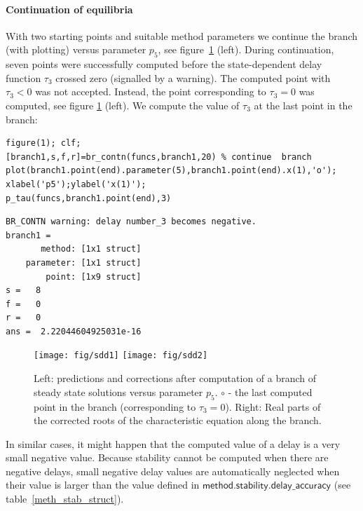 \documentclass[10pt]{scrartcl}
\newcommand{\parm}[1]{\mathsf{#1}}
\begin{document}
\paragraph{Continuation of equilibria}
With two starting points and suitable method parameters
we continue the branch (with plotting) versus parameter $p_5$,
see figure~\ref{br_stst} (left).
During continuation, seven points were successfully computed
before the state-dependent delay function $\tau_3$ crossed zero 
(signalled by a warning). 
The computed point with $\tau_3<0$ was not accepted. Instead, the point 
corresponding to $\tau_3=0$ was computed, see figure
\ref{br_stst} (left). We compute the value of $\tau_3$ at 
the last point in the branch:
\begin{lstlisting}
figure(1); clf;
[branch1,s,f,r]=br_contn(funcs,branch1,20) % continue  branch
plot(branch1.point(end).parameter(5),branch1.point(end).x(1),'o');
xlabel('p5');ylabel('x(1)');
p_tau(funcs,branch1.point(end),3)  
\end{lstlisting}
{\small
\begin{verbatim}
BR_CONTN warning: delay number_3 becomes negative.
branch1 = 
       method: [1x1 struct]
    parameter: [1x1 struct]
        point: [1x9 struct]
s =   8
f =   0
r =   0
ans =  2.22044604925031e-16
\end{verbatim}}

\begin{figure}[h]
\begin{center}
\texttt{[image: fig/sdd1]}
\texttt{[image: fig/sdd2]}
\end{center}
\caption{\label{br_stst} Left: predictions and corrections
after computation of a branch of steady state solutions versus
parameter $p_5$. $\circ$ - the last computed point in the branch
(corresponding to $\tau_3=0$). Right: Real parts of the corrected roots 
of the characteristic equation along the branch.}
\end{figure}
In similar cases, it might happen that the computed value of a delay is 
a very small negative value. 
Because stability cannot be computed when there are negative delays, 
small negative delay values are automatically neglected
when their value is larger than the value defined in
$\parm{method.stability.delay\_accuracy}$ (see table~\ref{meth_stab_struct}).
\end{document}
